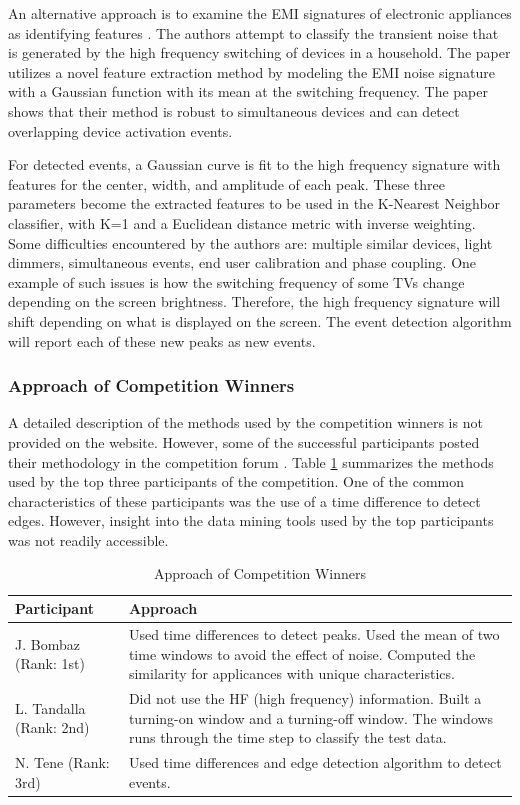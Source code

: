 \documentclass[11pt, letterpaper]{article}
\begin{document}
An alternative approach is to examine the EMI signatures of electronic appliances as identifying features \cite{EMI}. The authors attempt to classify the transient noise that is generated by the high frequency switching of devices in a household. The paper utilizes a novel feature extraction method by modeling the EMI noise signature with a Gaussian function with its mean at the switching frequency.  The paper shows that their method is robust to simultaneous devices and can detect overlapping device activation events.    

For detected events, a Gaussian curve is fit to the high frequency signature with features for the center, width, and amplitude of each peak.  These three parameters become the extracted features to be used in the K-Nearest Neighbor classifier, with K=1 and a Euclidean distance metric with inverse weighting. Some difficulties encountered by the authors are: multiple similar devices, light dimmers, simultaneous events, end user calibration and phase coupling. One example of such issues is how the switching frequency of some TVs change depending on the screen brightness.  Therefore, the high frequency signature will shift depending on what is displayed on the screen.  The event detection algorithm will report each of these new peaks as new events.  

\subsubsection{Approach of Competition Winners}
A detailed description of the methods used by the competition winners is not provided on the website. However, some of the successful participants posted their methodology in the competition forum \cite{Kaggle}.  Table \ref{winners} summarizes the methods used by the top three participants of the competition. One of the common characteristics of these participants was the use of a time difference to detect edges. However, insight into the data mining tools used by the top participants was not readily accessible.

\begin{table}[H]
\caption{Approach of Competition Winners}\label{winners}
\begin{center}
\begin{tabular}{|p{4.2cm}|p{11cm}|}\hline
\textbf{Participant} & \textbf{Approach}\\
\hline
J. Bombaz (Rank: 1st) & Used time differences to detect peaks.  Used the mean of two time windows to avoid the effect of noise.  Computed the similarity for applicances with unique characteristics. \\
\hline
L. Tandalla (Rank: 2nd) & Did not use the HF (high frequency) information.  Built a turning-on window and a turning-off window.  The windows runs through the time step to classify the test data.\\
\hline
N. Tene (Rank: 3rd) & Used time differences and edge detection algorithm to detect events.  \\
\hline
\end{tabular}
\end{center}
\end{table}
\end{document}
